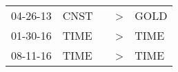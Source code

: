 \begin{supertabular}{p{0.07\textwidth}p{0.06\textwidth}p{0.02\textwidth}p{0.02\textwidth}p{0.06\textwidth}}
 04-26-13\textsuperscript{} &  CNST\textsuperscript{} &   &  \textgreater &  GOLD\textsuperscript{} \\
 01-30-16\textsuperscript{} &  TIME\textsuperscript{} &   &  \textgreater &  TIME\textsuperscript{} \\
 08-11-16\textsuperscript{} &  TIME\textsuperscript{} &   &  \textgreater &  TIME\textsuperscript{} \\
\end{supertabular}

